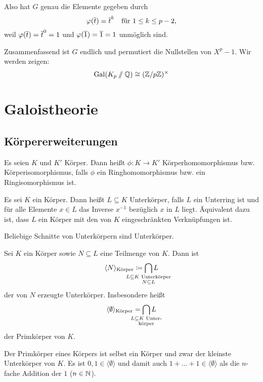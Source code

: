 \documentclass[12pt,a4paper]{scrartcl}
\begin{document}
Also hat $G$ genau die Elemente gegeben durch \[ \varphi(\overline t) = \overline t^k \quad \text{für $1\le k \le p-2$}, \]
weil $\varphi(\overline t) = \overline t^0 = 1$ und $\varphi(\overline 1) = \overline 1 = 1$ unmöglich sind.

Zusammenfassend ist $G$ endlich und permutiert die Nullstellen von $X^p-1$. Wir werden zeigen:
\[
\operatorname{Gal}(K_p \sslash \mathbb Q) \cong (\mathbb Z/p\mathbb Z)^\times
\]

\section{Galoistheorie}
\subsection{Körpererweiterungen}
\begin{defi}
	Es seien $K$ und $K'$ Körper. Dann heißt $\phi : K \to K'$ Körperhomomorphismus bzw. Körperisomorphismus, falls $\phi$ ein Ringhomomorphismus bzw. ein Ringisomorphismus ist.
\end{defi}

\begin{defi}
	Es sei $K$ ein Körper. Dann heißt $L \subseteq K$ Unterkörper, falls $L$ ein Unterring ist und für alle Elemente $x \in L$ das Inverse $x^{-1}$ bezüglich $x$ in $L$ liegt. Äquivalent dazu ist, dass $L$ ein Körper mit den von $K$ eingeschränkten Verknüpfungen ist.
\end{defi}

\begin{bem}
	Beliebige Schnitte von Unterkörpern sind Unterkörper.
\end{bem}

\begin{defi}
	Sei $K$ ein Körper sowie $N\subseteq L$ eine Teilmenge von $K$. Dann ist
	\[
	\langle N\rangle_\text{Körper} \coloneqq \bigcap_{\mathclap{\substack{L \subseteq K\text{ Unterkörper}\\N\subseteq L}}} L
	\]
	der von $N$ erzeugte Unterkörper. Insbesondere heißt
	\[
	\langle \emptyset\rangle_\text{Körper} = \bigcap_{\mathclap{\substack{L \subseteq K\text{ Unter-}\\\text{körper}}}} L
	\]
	der Primkörper von $K$.
\end{defi}


\begin{bem}
	Der Primkörper eines Körpers ist selbst ein Körper und zwar der kleinste Unterkörper von $K$. Es ist $0,1\in \langle\emptyset\rangle$ und damit auch $1+\dots+1 \in \langle \emptyset\rangle$ als die $n$-fache Addition der $1$ ($n\in\mathbb N$).
\end{bem}
\end{document}
